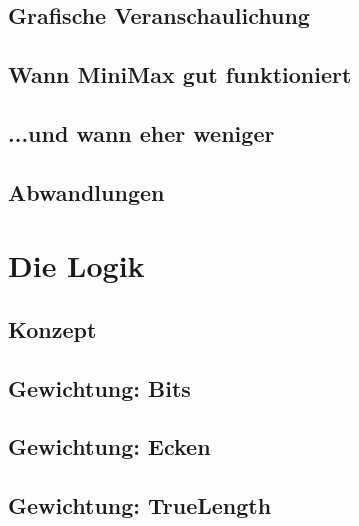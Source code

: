 \documentclass[12pt, draft]{beamer}
\begin{document}
\subsection{Grafische Veranschaulichung} \begin{frame}\end{frame}
\subsection{Wann MiniMax gut funktioniert} \begin{frame}\end{frame}
\subsection{...und wann eher weniger} \begin{frame}\end{frame}
\subsection{Abwandlungen} \begin{frame}\end{frame}

\section{Die Logik}
\subsection{Konzept} \begin{frame}\end{frame}
\subsection{Gewichtung: Bits} \begin{frame}\end{frame}
\subsection{Gewichtung: Ecken} \begin{frame}\end{frame}
\subsection{Gewichtung: TrueLength} \begin{frame}\end{frame}
\end{document}
